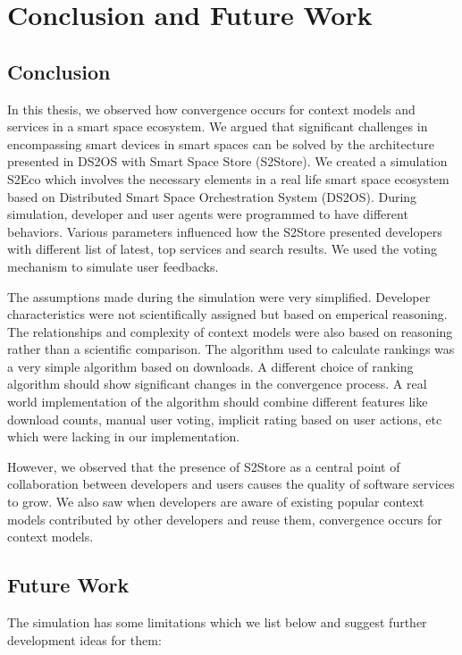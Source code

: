 \chapter{Conclusion and Future Work}
\label{chap:conclusion_and_future_work}

\section*{Conclusion}

In this thesis, we observed how convergence occurs for context models and services in a smart space ecosystem. We argued that significant challenges in encompassing smart devices in smart spaces can be solved by the architecture presented in DS2OS with Smart Space Store (S2Store). We created a simulation S2Eco which involves the necessary elements in a real life smart space ecosystem based on Distributed Smart Space Orchestration System (DS2OS). During simulation, developer and user agents were programmed to have different behaviors. Various parameters influenced how the S2Store presented developers with different list of latest, top services and search results. We used the voting mechanism to simulate user feedbacks.

The assumptions made during the simulation were very simplified. Developer characteristics were not scientifically assigned but based on emperical reasoning. The relationships and complexity of context models were also based on reasoning rather than a scientific comparison. The algorithm used to calculate rankings was a very simple algorithm based on downloads. A different choice of ranking algorithm should show significant changes in the convergence process. A real world implementation of the algorithm should combine different features like download counts, manual user voting, implicit rating based on user actions, etc which were lacking in our implementation.

However, we observed that the presence of S2Store as a central point of collaboration between developers and users causes the quality of software services to grow. We also saw when developers are aware of existing popular context models contributed by other developers and reuse them, convergence occurs for context models.


\section*{Future Work}

The simulation has some limitations which we list below and suggest further development ideas for them:

